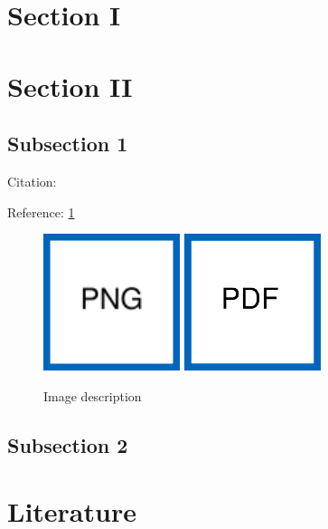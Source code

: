 \documentclass[YQMreport, %
							 optBiber   %
							 ]{YQMlatex}%
\begin{document}
%
	\section{Section I}
		\blindtext%

	\section{Section II}
		\subsection{Subsection 1}
			Citation: \cite{dlr51175}\par%
			Reference: \cref{fig:MyImage}\par%
			\begin{figure}[htb]%
			    \centering%
			    \includegraphics[width=40mm]{figures/ImagePNG.png}%
			    \hspace*{5mm}%
			    \includegraphics[width=40mm]{figures/ImagePDF.pdf}\par%
			    \caption{Image description}%
			    \label{fig:MyImage}%
			\end{figure}
		\subsection{Subsection 2}
			\blindtext

	\section{Literature}
		\printbibliography[heading=none]%
\end{document}

